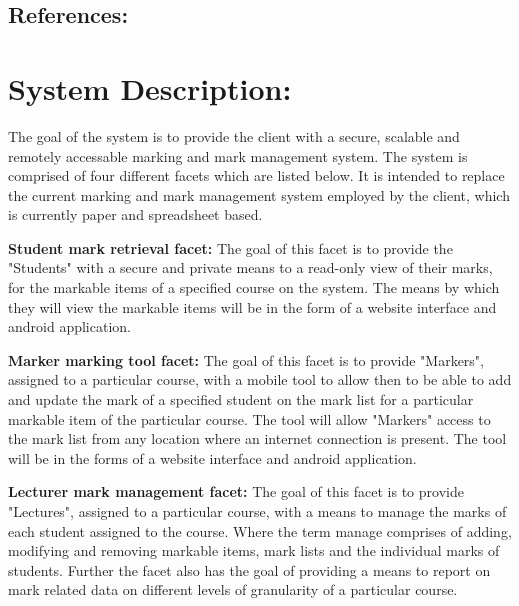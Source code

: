 \documentclass[12pt]{article}
\begin{document}
		
	
	\vspace{0.2in}
	
		\subsection{References:}
		\vspace{0.1in}
			
	
	\vspace{0.5in}
	
	\section{System Description:} %
	\vspace{0.2in}
	
	The goal of the system is to provide the client with a secure, scalable and remotely accessable marking and mark management system. The system is comprised of four different facets which are listed below. It is intended to replace the current marking and mark management system employed by the client, which is currently paper and spreadsheet based.
	
	\textbf{Student mark retrieval facet:}
	\vspace{0.1in}
	The goal of this facet is to provide the "Students" with a secure and private  means to a read-only view of their marks, for the markable items of a specified course on the system. The means by which they will view the markable items will be in the form of a website interface and android application.
	
	\textbf{Marker marking tool facet:}
	\vspace{0.1in}
	The goal of this facet is to provide "Markers", assigned to a particular course, with a mobile tool to allow then to be able to add and update the mark of a specified student on the mark list for a particular markable item of the particular course. The tool will allow "Markers" access to the mark list from any location where an internet connection is present. The tool will be in the forms of a website interface and android application.   	
	
	\textbf{Lecturer mark management facet:}
	\vspace{0.1in}
	The goal of this facet is to provide "Lectures", assigned to a particular course, with a means to manage the marks of each student assigned to the course. Where the term manage comprises of adding, modifying and removing markable items, mark lists and the individual marks of students. Further the facet also has the goal of providing a means to report on mark related data on different levels of granularity of a particular course.  
	
\end{document}
